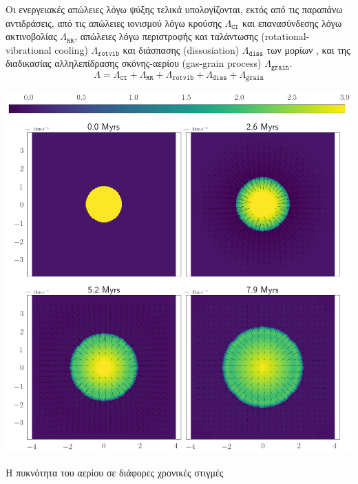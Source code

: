 \documentclass[article,a4paper,11.2pt]{memoir}
\numberwithin{equation}{subsection}
\begin{document}
	Οι ενεργειακές απώλειες λόγω ψύξης τελικά υπολογίζονται, εκτός από τις παραπάνω αντιδράσεις, από τις απώλειες ιονισμού λόγω κρούσης $\Lambda _{\mathtt{CI}}$ και επανασύνδεσης λόγω ακτινοβολίας $\Lambda _{\mathtt{RR}}$, απώλειες λόγω περιστροφής και ταλάντωσης (rotational-vibrational cooling) $\Lambda _{\mathtt{rotvib}}$ και διάσπασης (dissosiation) $\Lambda _{\mathtt{diss}}$ των μορίων , και της διαδικασίας αλληλεπίδρασης σκόνης-αερίου (gas-grain process) $\Lambda _{\mathtt{grain}}$.
	\begin{equation}
	\Lambda = \Lambda _{\mathtt{CI}} + \Lambda _{\mathtt{RR}} +\Lambda _{\mathtt{rotvib}} + \Lambda _{\mathtt{diss}} + \Lambda _{\mathtt{grain}}
	\end{equation}
	

	\begin{marginfigure}
	\includegraphics[width=1.\linewidth]{DataImages/H2CoolingRHOquad}
	\caption{Η πυκνότητα του αερίου σε διάφορες χρονικές στιγμές}
	\label{fig:h2coolingrhoquad}
\end{marginfigure}	
\end{document}
